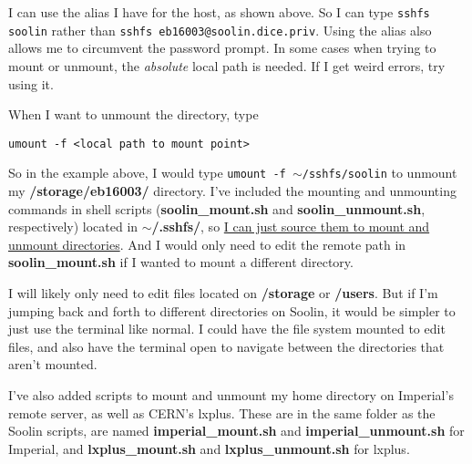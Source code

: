 I can use the alias I have for the host, as shown above. So I can type \texttt{sshfs soolin} rather than \texttt{sshfs eb16003@soolin.dice.priv}. Using the alias also allows me to circumvent the password prompt. In some cases when trying to mount or unmount, the \emph{absolute} local path is needed. If I get weird errors, try using it.

When I want to unmount the directory, type

\texttt{umount -f <local path to mount point>}

So in the example above, I would type \texttt{umount -f $\sim$/sshfs/soolin} to unmount my \textbf{/storage/eb16003/} directory. I've included the mounting and unmounting commands in shell scripts (\textbf{soolin\_mount.sh} and \textbf{soolin\_unmount.sh}, respectively) located in \textbf{$\sim$/.sshfs/}, so \underline{I can just source them to mount and unmount directories}. And I would only need to edit the remote path in \textbf{soolin\_mount.sh} if I wanted to mount a different directory.

I will likely only need to edit files located on \textbf{/storage} or \textbf{/users}. But if I'm jumping back and forth to different directories on Soolin, it would be simpler to just use the terminal like normal. I could have the file system mounted to edit files, and also have the terminal open to navigate between the directories that aren't mounted.

I've also added scripts to mount and unmount my home directory on Imperial's remote server, as well as CERN's lxplus. These are in the same folder as the Soolin scripts, are named \textbf{imperial\_mount.sh} and \textbf{imperial\_unmount.sh} for Imperial, and \textbf{lxplus\_mount.sh} and \textbf{lxplus\_unmount.sh} for lxplus.
